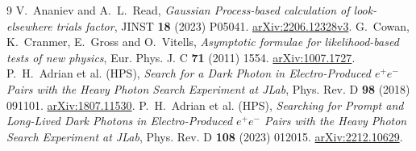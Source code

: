 \documentclass[11pt]{article}
\begin{document}
\clearpage
\begingroup
\def\lowmassfigurepath{../../v4p9p16_2015_lowmass_side_study_20260906/figures}

\endgroup

\clearpage
\begin{thebibliography}{9}
 V.~Ananiev and A.~L.~Read, \emph{Gaussian Process-based calculation of look-elsewhere trials factor}, JINST \textbf{18} (2023) P05041. \href{https://arxiv.org/abs/2206.12328v3}{arXiv:2206.12328v3}.
 G.~Cowan, K.~Cranmer, E.~Gross and O.~Vitells, \emph{Asymptotic formulae for likelihood-based tests of new physics}, Eur. Phys. J. C \textbf{71} (2011) 1554. \href{https://arxiv.org/abs/1007.1727}{arXiv:1007.1727}.
 P.~H.~Adrian et al. (HPS), \emph{Search for a Dark Photon in Electro-Produced $e^+e^-$ Pairs with the Heavy Photon Search Experiment at JLab}, Phys. Rev. D \textbf{98} (2018) 091101. \href{https://arxiv.org/abs/1807.11530}{arXiv:1807.11530}.
 P.~H.~Adrian et al. (HPS), \emph{Searching for Prompt and Long-Lived Dark Photons in Electro-Produced $e^+e^-$ Pairs with the Heavy Photon Search Experiment at JLab}, Phys. Rev. D \textbf{108} (2023) 012015. \href{https://arxiv.org/abs/2212.10629}{arXiv:2212.10629}.
\end{thebibliography}
\end{document}
